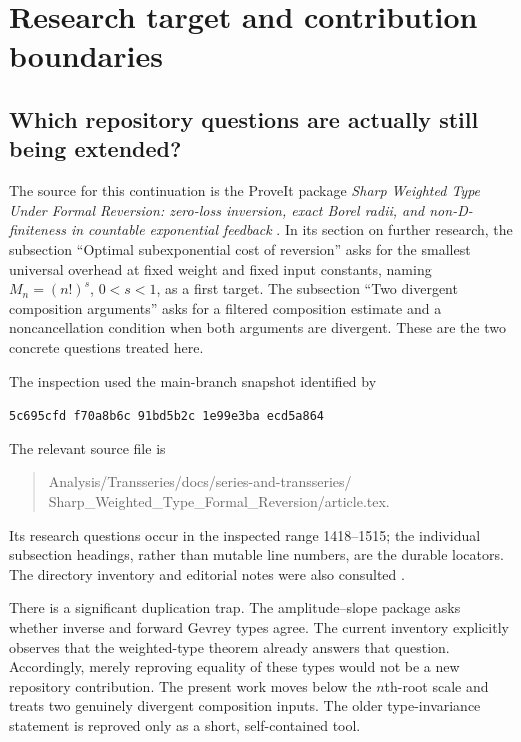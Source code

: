 \documentclass[11pt,a4paper]{article}
\theoremstyle{definition}
\theoremstyle{remark}
\newcommand{\commit}{\texttt{5c695cfd\,f70a8b6c\,91bd5b2c\,1e99e3ba\,ecd5a864}}
\numberwithin{equation}{section}
\begin{document}
\section{Research target and contribution boundaries}\label{sec:target}

\subsection{Which repository questions are actually still being extended?}
The source for this continuation is the ProveIt package
\emph{Sharp Weighted Type Under Formal Reversion: zero-loss inversion,
exact Borel radii, and non-D-finiteness in countable exponential feedback}
\cite{repo,weighted}. In its section on further research, the subsection
``Optimal subexponential cost of reversion'' asks for the smallest
universal overhead at fixed weight and fixed input constants, naming
$M_n=(n!)^s$, $0<s<1$, as a first target. The subsection ``Two divergent
composition arguments'' asks for a filtered composition estimate and a
noncancellation condition when both arguments are divergent. These are
the two concrete questions treated here.

The inspection used the main-branch snapshot identified by
\begin{center}\commit\end{center}
The relevant source file is
\begin{quote}\small\ttfamily
Analysis/Transseries/docs/series-and-transseries/\\
Sharp\_Weighted\_Type\_Formal\_Reversion/article.tex.
\end{quote}
Its research questions occur in the inspected range 1418--1515; the
individual subsection headings, rather than mutable line numbers, are
the durable locators. The directory inventory and editorial notes were
also consulted \cite{inventory}.

There is a significant duplication trap. The amplitude--slope package
\cite{amplitude} asks whether inverse and forward Gevrey types agree.
The current inventory explicitly observes that the weighted-type theorem
already answers that question. Accordingly, merely reproving equality of
these types would not be a new repository contribution. The present work
moves below the $n$th-root scale and treats two genuinely divergent
composition inputs. The older type-invariance statement is reproved only
as a short, self-contained tool.
\end{document}
